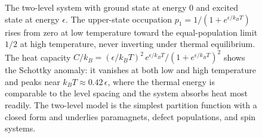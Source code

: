 \begin{figure}[htbp]
\centering
{}
\caption[Two-level system: occupation and Schottky heat capacity]{The two-level
system with ground state at energy $0$ and excited state at energy $\epsilon$.
The upper-state occupation $p_1=1/(1+e^{\epsilon/k_B T})$ rises from zero at low
temperature toward the equal-population limit $1/2$ at high temperature, never
inverting under thermal equilibrium. The heat capacity
$C/k_B=(\epsilon/k_B T)^2\,e^{\epsilon/k_B T}/(1+e^{\epsilon/k_B T})^2$ shows the
Schottky anomaly: it vanishes at both low and high temperature and peaks near
$k_B T\approx0.42\,\epsilon$, where the thermal energy is comparable to the
level spacing and the system absorbs heat most readily. The two-level model is
the simplest partition function with a closed form and underlies paramagnets,
defect populations, and spin systems.}
\label{fig:vol04ch04:two-level-system}
\end{figure}
